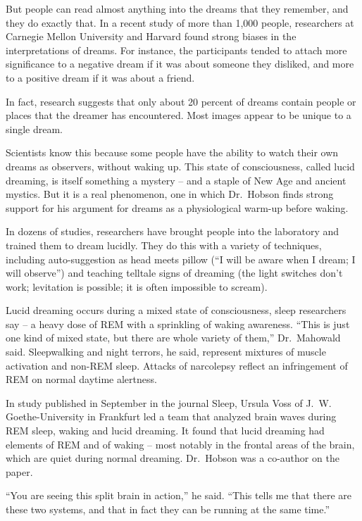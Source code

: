 ﻿\documentclass[12pt]{article}
\begin{document}
But people can read almost anything into the dreams that they remember, and they do exactly that. In
a recent study of more than 1,000 people, researchers at Carnegie Mellon University and Harvard
found strong biases in the interpretations of dreams. For instance, the participants tended to
attach more significance to a negative dream if it was about someone they disliked, and more to a
positive dream if it was about a friend.

In fact, research suggests that only about 20 percent of dreams contain people or places that the
dreamer has encountered. Most images appear to be unique to a single dream.

Scientists know this because some people have the ability to watch their own dreams as observers,
without waking up. This state of consciousness, called lucid dreaming, is itself something a mystery
-- and a staple of New Age and ancient mystics. But it is a real phenomenon, one in which Dr.~Hobson
finds strong support for his argument for dreams as a physiological warm-up before waking.

In dozens of studies, researchers have brought people into the laboratory and trained them to dream
lucidly. They do this with a variety of techniques, including auto-suggestion as head meets pillow
(``I will be aware when I dream; I will observe'') and teaching telltale signs of dreaming (the
light switches don't work; levitation is possible; it is often impossible to scream).

Lucid dreaming occurs during a mixed state of consciousness, sleep researchers say -- a heavy dose
of REM with a sprinkling of waking awareness. ``This is just one kind of mixed state, but there are
whole variety of them,'' Dr.~Mahowald said. Sleepwalking and night terrors, he said, represent
mixtures of muscle activation and non-REM sleep. Attacks of narcolepsy reflect an infringement of
REM on normal daytime alertness.

In study published in September in the journal Sleep, Ursula Voss of J.~W. Goethe-University in
Frankfurt led a team that analyzed brain waves during REM sleep, waking and lucid dreaming. It found
that lucid dreaming had elements of REM and of waking -- most notably in the frontal areas of the
brain, which are quiet during normal dreaming. Dr.~Hobson was a co-author on the paper.

``You are seeing this split brain in action,'' he said. ``This tells me that there are these two
systems, and that in fact they can be running at the same time.''
\end{document}
